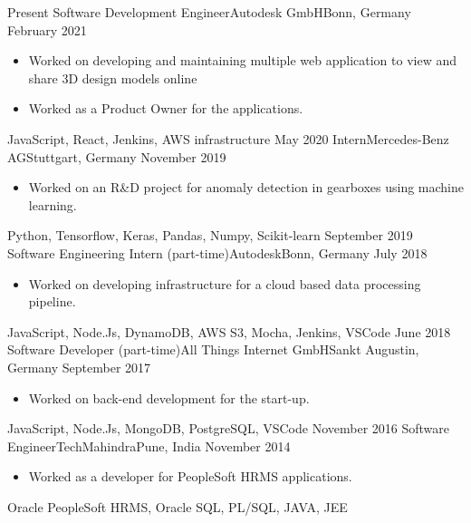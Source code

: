 %
%
%
\begin{experiences}
  \experience
  {Present} {Software Development Engineer}{Autodesk GmbH}{Bonn, Germany}
  {February 2021} {
    \begin{itemize}
      \item Worked on developing and maintaining multiple web application to view and share 3D design models online
      \item Worked as a Product Owner for the applications.
    \end{itemize}
  }
  {JavaScript, React, Jenkins, AWS infrastructure}
  \emptySeparator
  \experience
  {May 2020} {Intern}{Mercedes-Benz AG}{Stuttgart, Germany}
  {November 2019} {
    \begin{itemize}
      \item Worked on an R\&D project for anomaly detection in gearboxes using machine learning.
    \end{itemize}
  }
  {Python, Tensorflow, Keras, Pandas, Numpy, Scikit-learn}
  \emptySeparator
  \experience
  {September 2019}   {Software Engineering Intern (part-time)}{Autodesk}{Bonn, Germany}
  {July 2018} {
    \begin{itemize}
      \item Worked on developing infrastructure for a cloud based data processing pipeline.
    \end{itemize}
  }
  {JavaScript, Node.Js, DynamoDB, AWS S3, Mocha, Jenkins, VSCode}
  \emptySeparator
  \experience
  {June 2018} {Software Developer (part-time)}{All Things Internet GmbH}{Sankt Augustin, Germany}
  {September 2017}    {
    \begin{itemize}
      \item Worked on back-end development for the start-up.
    \end{itemize}
  }
  {JavaScript, Node.Js, MongoDB, PostgreSQL, VSCode}
  \emptySeparator
  \experience
  {November 2016}     {Software Engineer}{TechMahindra}{Pune, India}
  {November 2014}    {
    \begin{itemize}
      \item Worked as a developer for PeopleSoft HRMS applications.
    \end{itemize}
  }
  {Oracle PeopleSoft HRMS, Oracle SQL, PL/SQL, JAVA, JEE}
\end{experiences}
